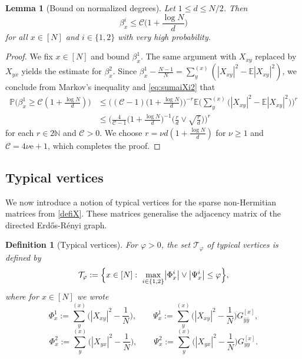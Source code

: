 \documentclass[11pt]{article}
\newcommand{\ee}{\mathrm{e}}
\newcommand{\abs}[1]{\left| #1 \right|}
\newcommand{\absb}[1]{\bigl| #1 \bigr|}
\newcommand{\N}{\mathbb{N}}
\theoremstyle{plain}
\newtheorem{lemma}{Lemma}[section]
\newtheorem{defi}{Definition}[section]
\theoremstyle{remark}
\numberwithin{equation}{section}
\newcommand*\bset[1]{[#1]}
\newcommand*\ubarr[1]{{\widehat{#1}}}
\begin{document}
	\begin{lemma}[Bound on normalized degrees] \label{lem:roughboundonbetaix}
	Let $1 \leq d \leq N/2$. Then 
		\begin{equation*}
			\beta_{x}^i \le \mathcal C \biggl( 1 + \frac{\log N}{d}\biggr)
		\end{equation*}
		for all $x \in [N]$ and $i \in \{1,2\}$ with very high probability. 
	\end{lemma}
	\begin{proof}
		We fix $x \in [N]$ and bound $\beta_x^1$. The same argument with $X_{xy}$ replaced by $X_{yx}$ yields the estimate for $\beta_x^2$. 
		Since $\beta_{x}^1 - \frac{N-1}{N} = \sum_{y}^{(x)}(\abs{X_{xy}}^2 - \mathbb{E}\abs{X_{xy}}^2)$, we conclude from Markov's inequality and \cref{eq:sumaiXi2} that
		\begin{align*}
			\mathbb{P}\biggl( \beta_x^1  \ge \mathcal{C}\left(1+ \frac{\log N}{d} \right)\biggr) &\le \biggl((\mathcal{C}-1) \biggl( 1 + \frac{\log N}{d} \biggr)\biggr)^{-r} \mathbb{E}\biggl(\sum_{y}^{(x)} \bigl(\abs{X_{xy}}^2 - \mathbb{E}\abs{X_{xy}}^2\bigr) \biggr)^r \\
			&\le  \biggl(\frac{4}{\mathcal{C}-1} \biggl( 1 + \frac{\log N}{d} \biggr)^{-1} \biggl( \frac{r}{d} \vee \sqrt{\frac{r}{d}} \biggr)\biggr)^r
		\end{align*}
		for each $r \in 2\N$ and $\mathcal C >0$. 
		We choose $r = \nu d (1 + \frac{\log N}{d})$ for $\nu \geq 1$ and $\mathcal C =4 \nu \ee + 1$, which completes the proof. 
	\end{proof}
	
	
	\subsection{Typical vertices} 
	\label{sec:typical_vertices} 
	
	We now introduce a notion of typical vertices for the sparse non-Hermitian matrices from \cref{defiX}.	These matrices generalise the adjacency matrix of the directed Erd{\H o}s-R\'enyi graph.  
	
	
\begin{defi}[Typical vertices]\label{def:typicalvertices}
		For $\varphi>0$, the set $\mathcal{T}_{\varphi}$ of \textup{typical vertices} is defined by 
			\begin{equation*}
			\mathcal{T}_{\varphi} := \Bigl\{ x \in [N] :~\max_{i \in \{1,2\}}\absb{\Phi^i_x}\vee \absb{\Psi^i_x }\le \varphi\Bigr\}, 
		\end{equation*}
		where for $x \in [N]$ we wrote
		\begin{equation*}
			\Phi^1_x:= \sum_{y}^{(x)}\bigg(|X_{xy}|^2 - \frac{1}{N}\bigg), \qquad \Psi^1_x:=  \sum_{y}^{(x)}\bigg(|X_{xy}|^2 - \frac{1}{N}\bigg) G^{\bset{x}}_{\ubarr{y}\ubarr{y}},
		\end{equation*}
		\begin{equation*}
			\Phi^2_x:= \sum_{y}^{(x)}\bigg(|X_{yx}|^2 - \frac{1}{N}\bigg),\qquad \Psi^2_x:=  \sum_{y}^{(x)}\bigg(|X_{yx}|^2 - \frac{1}{N}\bigg) G^{\bset{x}}_{yy}.
		\end{equation*}
	\end{defi}
 
\end{document}
